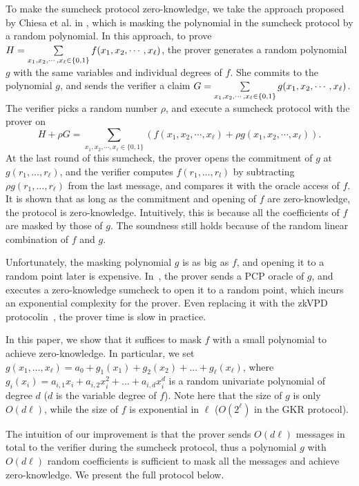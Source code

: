 To make the sumcheck protocol zero-knowledge, we take the approach proposed by Chiesa et al. in \cite{zksumcheck}, which is masking the polynomial in the sumcheck protocol by a random polynomial. In this approach, to prove $H = \sum\limits_{x_1, x_2, \cdots, x_\ell \in \{0,1\}}f(x_1, x_2, \cdots, x_\ell)$, the prover generates a random polynomial $g$ with the same variables and individual degrees of $f$. She commits to the polynomial $g$, and sends the verifier a claim $G = \sum\limits_{x_1, x_2, \cdots, x_\ell \in \{0,1\}}g(x_1, x_2, \cdots, x_\ell)$. The verifier picks a random number $\rho$, and execute a sumcheck protocol with the prover on $$H + \rho G = \sum\limits_{x_1, x_2, \cdots, x_\ell \in \{0, 1\}}(f(x_1, x_2, \cdots, x_\ell) + \rho g(x_1, x_2, \cdots, x_\ell)).$$ At the last round of this sumcheck, the prover opens the commitment of $g$ at $g(r_1, \ldots, r_\ell)$, and the verifier computes $f(r_1, \ldots, r_l)$ by subtracting $\rho g(r_1, \ldots, r_\ell)$ from the last message, and compares it with the oracle access of $f$. It is shown that as long as the commitment and opening of $f$ are zero-knowledge, the protocol is zero-knowledge. Intuitively, this is because all the coefficients of $f$ are masked by those of $g$. The soundness still holds because of the random linear combination of $f$ and $g$. 

Unfortunately, the masking polynomial $g$ is as big as $f$, and opening it to a random point later is expensive. In~\cite{zksumcheck}, the prover sends a PCP oracle of $g$, and executes a zero-knowledge sumcheck to open it to a random point, which incurs an exponential complexity for the prover. Even replacing it with the zkVPD protocolin~\cite{zkvpd}, the prover time is slow in practice.

In this paper, we show that it suffices to mask $f$ with a small polynomial to achieve zero-knowledge. In particular, we set $g(x_1, \ldots, x_\ell) = a_{0} + g_1(x_1) + g_2(x_2) + \ldots + g_\ell(x_\ell)$, where $g_{i}(x_i) = a_{i,1}x_i + a_{i,2}x_i^2 + \ldots + a_{i,d}x_i^d$ is a random univariate polynomial of degree $d$ ($d$ is the variable degree of $f$). Note here that the size of $g$ is only $O(d\ell)$, while the size of $f$ is exponential in $\ell$ ($O(2^\ell)$ in the GKR protocol).

The intuition of our improvement is that the prover sends $O(d\ell)$ messages in total to the verifier during the sumcheck protocol, thus a polynomial $g$ with $O(d\ell)$ random coefficients is sufficient to mask all the messages and achieve zero-knowledge. We present the full protocol below. 


